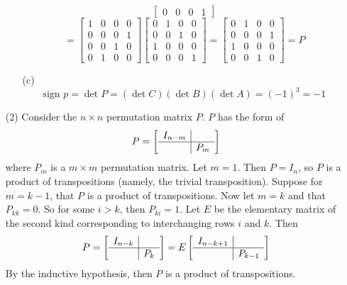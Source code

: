 \begin{itemize}
\begin{itemize}
$$\begin{bmatrix}
0 & 0 & 0 & 1
\end{bmatrix}$$
$$= \begin{bmatrix}
1 & 0 & 0 & 0 \\
0 & 0 & 0 & 1 \\
0 & 0 & 1 & 0 \\
0 & 1 & 0 & 0
\end{bmatrix}\begin{bmatrix}
0 & 1 & 0 & 0 \\
0 & 0 & 1 & 0 \\
1 & 0 & 0 & 0 \\
0 & 0 & 0 & 1
\end{bmatrix} = \begin{bmatrix}
0 & 1 & 0 & 0 \\
0 & 0 & 0 & 1 \\
1 & 0 & 0 & 0 \\
0 & 0 & 1 & 0
\end{bmatrix} = P$$
\item[(c)]
$$\text{sign } p = \det P = (\det C)(\det B)(\det A) = (-1)^3 = -1$$
\end{itemize}
\item[(2)]
Consider the $n \times n$ permutation matrix $P$. $P$ has the form of
$$P = \begin{bmatrix}
\begin{array}{c|c}
I_{n-m} \\
\hline
& P_m
\end{array}
\end{bmatrix}$$
where $P_m$ is a $m \times m$ permutation matrix. Let $m = 1$. Then $P = I_n$, so $P$ is a product of transpositions (namely, the trivial transposition). Suppose for $m = k - 1$, that $P$ is a product of transpositions. Now let $m = k$ and that $P_{kk} = 0$. So for some $i > k$, then $P_{ki} = 1$. Let $E$ be the elementary matrix of the second kind corresponding to interchanging rows $i$ and $k$. Then
$$P = \begin{bmatrix}
\begin{array}{c|c}
I_{n-k} \\
\hline
& P_k
\end{array}
\end{bmatrix} = E
\begin{bmatrix}
\begin{array}{c|c}
I_{n-k+1} \\
\hline
& P_{k-1}
\end{array}
\end{bmatrix}$$
By the inductive hypothesis, then $P$ is a product of transpositions.

\end{itemize}
